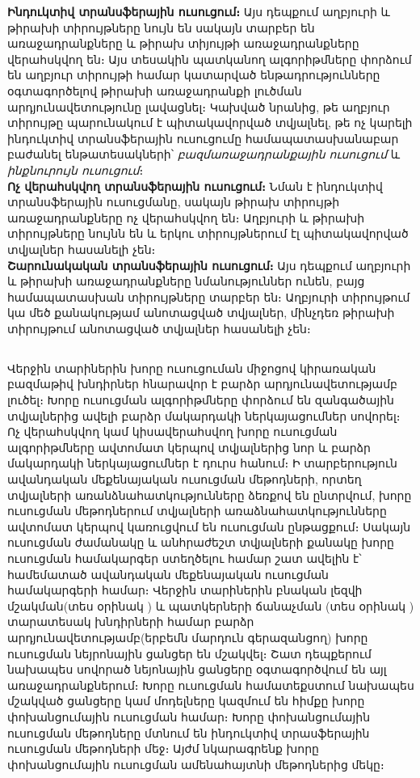 \documentclass[12pt]{article}
\begin{document}
\noindent \textbf{Ինդուկտիվ տրանսֆերային ուսուցում։}  Այս դեպքում աղբյուրի և թիրախի տիրույթները նույն են սակայն տարբեր են առաջադրանքները և թիրախ տիյույթի առաջադրանքները վերահսկվող են։ Այս տեսակին պատկանող ալգորիթմները փորձում են աղբյուր տիրույթի համար կատարված ենթադրությունները օգտագործելով  թիրախի առաջադրանքի լուծման արդյունավետությունը լավացնել։ Կախված նրանից, թե աղբյուր տիրույթը պարունակում է պիտակավորված տվյալնել, թե ոչ  կարելի ինդուկտիվ տրանսֆերային ուսուցումը համապատասխանաբար բաժանել ենթատեսակների՝ \textit{բազմառաջադրանքային ուսուցում} և  \textit{ինքնուրույն ուսուցում}։\\

\noindent \textbf{Ոչ վերահսկվող տրանսֆերային ուսուցում։} Նման է ինդուկտիվ տրանսֆերային ուսուցմանը, սակայն թիրախ տիրույթի առաջադրանքները ոչ վերահսկվող  են։ Աղբյուրի և թիրախի տիրույթները  նույնն են և երկու տիրույթներում էլ պիտակավորված տվյալներ հասանելի չեն։ \\


\noindent \textbf{Շարունակական տրանսֆերային ուսուցում։}
Այս դեպքում աղբյուրի և թիրախի առաջադրանքները նմանություններ ունեն, բայց համապատասխան տիրույթները տարբեր են։ Աղբյուրի տիրույթում կա մեծ քանակությամ անոտացված տվյալներ, մինչդեռ թիրախի տիրույթում անոտացված տվյալներ հասանելի չեն։ \\

\begin{center}
\subsection*{
 } 
 \end{center}
 \noindent
{}
{}

Վերջին տարիներին խորը ուսուցուման միջոցով կիրառական բազմաթիվ խնդիրներ հնարավոր է բարձր արդյունավետությամբ լուծել։ Խորը ուսուցման ալգորիթմները փորձում են զանգածային տվյալներից ավելի բարձր մակարդակի  ներկայացումներ սովորել։  Ոչ վերահսկվող կամ կիսավերահսվող խորը ուսուցման ալգորիթմները ավտոմատ կերպով տվյալներից նոր և բարձր մակարդակի ներկայացումներ է դուրս հանում։ Ի տարբերություն ավանդական մեքենայական ուսուցման մեթոդների, որտեղ  տվյալների առանձնահատկությունները ձեռքով են ընտրվում,  խորը ուսուցման մեթոդներում տվյալների առաձնահատկությունները ավտոմատ կերպով կառուցվում են ուսուցման ընթացքում։ Սակայն ուսուցման ժամանակը և անհրաժեշտ տվյալների քանակը խորը ուսուցման համակարգեր ստեղծելու համար շատ ավելին է՝ համեմատած ավանդական մեքենայական ուսուցման համակարգերի համար։ Վերջին տարիներին բնական լեզվի մշակման(տես օրինակ \cite{bib_item_6, bib_item_7}) և պատկերների ճանաչման (տես օրինակ \cite{bib_item_4, bib_item_5}) տարատեսակ խնդիրների համար բարձր արդյունավետությամբ(երբեմն մարդուն գերազանցող) խորը ուսուցման նեյրոնային ցանցեր են  մշակվել։ Շատ դեպքերում նախապես սովորած նեյոնային ցանցերը օգտագործվում են այլ առաջադրանքներում։ Խորը ուսուցման համատեքստում նախապես մշակված ցանցերը կամ մոդելները կազմում են հիմքը  խորը փոխանցումային ուսուցման համար։ Խորը փոխանցումային ուսուցման մեթոդները մտնում են ինդուկտիվ տրասֆերային ուսուցման մեթոդների մեջ։ Այժմ նկարագրենք խորը փոխանցումային ուսուցման ամենահայտնի մեթոդներից մեկը։ \\
\end{document}
